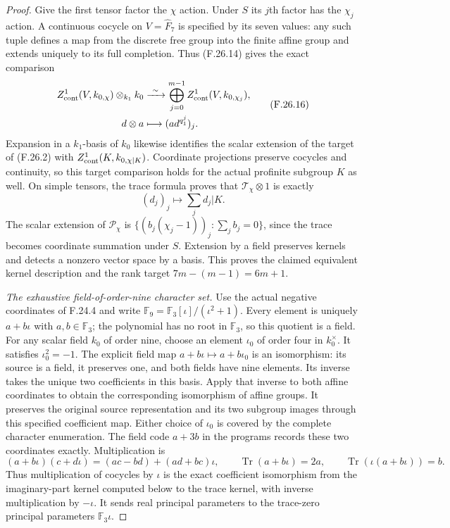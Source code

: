 \begin{proof}
Give the first tensor factor the $\chi$ action.
Under $S$ its $j$th factor has the $\chi_j$ action.
A continuous cocycle on $V=\widehat F_7$ is specified
by its seven values: any such tuple defines a map
from the discrete free group into the finite affine
group and extends uniquely to its full completion.
Thus (F.26.14) gives the exact comparison
\[
 \begin{aligned}
 Z^1_{\rm cont}(V,k_{0,\chi})\otimes_{k_1}k_0
    &\xrightarrow{\ \sim\ }
       \bigoplus_{j=0}^{m-1}Z^1_{\rm cont}(V,k_{0,\chi_j}),\\
 d\otimes a&\longmapsto(a d^{q_1^j})_j .
 \end{aligned}                                                \tag{F.26.16}
\]
Expansion in a $k_1$-basis of $k_0$ likewise identifies
the scalar extension of the target of (F.26.2)
with $Z^1_{\rm cont}(K,k_{0,\chi|K})$. Coordinate
projections preserve cocycles and continuity, so
this target comparison holds for the actual
profinite subgroup $K$ as well. On simple tensors,
the trace formula proves that $\mathscr T_\chi\otimes1$
is exactly
\[
                  (d_j)_j\longmapsto\sum_j d_j|K.              \tag{F.26.17}
\]
The scalar extension of $\mathscr P_\chi$ is
$\{(b_j(\chi_j-1))_j:\sum_jb_j=0\}$, since
the trace becomes coordinate summation under $S$.
Extension by a field preserves kernels and detects
a nonzero vector space by a basis. This proves
the claimed equivalent kernel description and
the rank target $7m-(m-1)=6m+1$.

\emph{The exhaustive field-of-order-nine character set.}
Use the actual negative coordinates of F.24.4 and
write $\mathbb F_9=\mathbb F_3[\iota]/(\iota^2+1)$.
Every element is uniquely $a+b\iota$ with
$a,b\in\mathbb F_3$; the polynomial has no root
in $\mathbb F_3$, so this quotient is a field.
For any scalar field $k_0$ of order nine, choose
an element $\iota_0$ of order four in $k_0^\times$.
It satisfies $\iota_0^2=-1$. The explicit field map
$a+b\iota\mapsto a+b\iota_0$ is an isomorphism:
its source is a field, it preserves one, and both
fields have nine elements. Its inverse takes the
unique two coefficients in this basis. Apply that
inverse to both affine coordinates to obtain the
corresponding isomorphism of affine groups. It
preserves the original source representation and
its two subgroup images through this specified
coefficient map. Either choice of $\iota_0$ is
covered by the complete character enumeration.
The field code $a+3b$ in the programs records these
two coordinates exactly. Multiplication is
\[
 (a+b\iota)(c+d\iota)=(ac-bd)+(ad+bc)\iota,
 \qquad
 \operatorname{Tr}(a+b\iota)=2a,\qquad
 \operatorname{Tr}(\iota(a+b\iota))=b .
                                                               \tag{F.26.18}
\]
Thus multiplication of cocycles by $\iota$ is the
exact coefficient isomorphism from the imaginary-part
kernel computed below to the trace kernel, with
inverse multiplication by $-\iota$. It sends
real principal parameters to the trace-zero
principal parameters $\mathbb F_3\iota$.


\end{proof}
